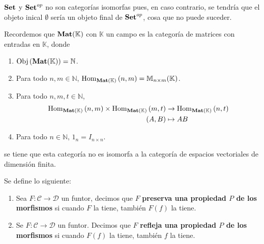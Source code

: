 \documentclass[12pt]{report}
\theoremstyle{largebreak}
\newcommand\cf[3]{\ensuremath{#1:#2\rightarrow#3}}
\newcommand{\Obj}[1]{\ensuremath{\textup{Obj}\left(#1\right)}}
\newcommand{\Hom}[3]{\ensuremath{\textup{Hom}_{#1}\left(#2,#3\right)}}
\newcommand{\Cat}[1]{\ensuremath{\textup{\textbf{#1}}}}
\begin{document}
    \begin{exa}
        $\Cat{Set}$ y $\Cat{Set}^{op}$ no son categorías isomorfas pues, en caso contrario, se tendría que el objeto inical $\emptyset$ sería un objeto final de $\Cat{Set}^{op}$, cosa que no puede suceder.
    \end{exa}

    \begin{exa}
        Recordemos que $\Cat{Mat}(\mathbb{K})$ con $\mathbb{K}$ un campo es la categoría de matrices con entradas en $\mathbb{K}$, donde
        \begin{enumerate}
            \item $\Obj{\Cat{Mat}(\mathbb{K})}=\mathbb{N}$.
            \item Para todo $n,m\in\mathbb{N}$, $\Hom{\Cat{Mat}(\mathbb{K})}{n}{m}=\mathbb{M}_{ n\times m}(\mathbb{K})$.
            \item Para todo $n,m,t\in\mathbb{N}$,
            \begin{equation*}
                \begin{split}
                    \Hom{\Cat{Mat}(\mathbb{K})}{n}{m}\times\Hom{\Cat{Mat}(\mathbb{K})}{m}{t}&\rightarrow\Hom{\Cat{Mat}(\mathbb{K})}{n}{t}\\
                    (A,B)&\mapsto AB
                \end{split}
            \end{equation*}
            \item Para todo $n\in\mathbb{N}$, $1_n=I_{n\times n}$.
        \end{enumerate}
        se tiene que esta categoría no es isomorfa a la categoría de espacios vectoriales de dimensión finita.
    \end{exa}

    \begin{mydef}
        Se define lo siguiente:
        \begin{enumerate}
            \item Sea $\cf{F}{\mathcal{C}}{\mathcal{D}}$ un funtor, decimos que $F$ \textbf{ preserva una propiedad $P$ de los morfismos} si cuando $F$ la tiene, también $F(f)$ la tiene.
            \item Se $\cf{F}{\mathcal{C}}{\mathcal{D}}$ un funtor. Decimos que $F$ \textbf{refleja una propiedad $P$ de los morfismos} si cuando $F(f)$ la tiene, también $f$ la tiene.
        \end{enumerate}
    \end{mydef}
\end{document}
